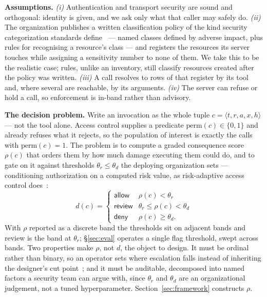 \textbf{Assumptions.} \emph{(i)} Authentication and transport security are
sound and orthogonal: identity is given, and we ask only what that caller may
safely do. \emph{(ii)} The organization publishes a written
classification policy of the kind security categorization standards
define~\cite{nist2004fips199,nist2008sp80060} --- named classes defined by
adverse impact, plus rules for recognising a resource's class --- and registers
the resources its server touches while assigning a sensitivity number to none of
them. We take this to be the realistic case; rules, unlike an inventory, still
classify resources created after the policy was written. \emph{(iii)} A call
resolves to rows of that register by its tool and, where several are reachable,
by its arguments. \emph{(iv)} The server can refuse or hold a call, so
enforcement is in-band rather than advisory.

\textbf{The decision problem.} Write an invocation as the whole tuple
$c = \langle t, r, a, x, h \rangle$ --- not the tool alone. Access control
supplies a predicate $\mathrm{perm}(c) \in \{0,1\}$ and already refuses what it
rejects, so the population of interest is exactly the calls with
$\mathrm{perm}(c) = 1$. The problem is to compute a graded
consequence score $\rho(c)$ that orders them by how much damage executing them
could do, and to gate on it against thresholds $\theta_{r} \le \theta_{d}$ the
deploying organization sets --- conditioning authorization on a computed risk
value, as risk-adaptive access
control does~\cite{cheng2007fuzzymls,kandala2011radac,atlam2020riskbased}:
\begin{equation}
  d(c) =
  \begin{cases}
    \textsf{allow}  & \rho(c) < \theta_{r} \\
    \textsf{review} & \theta_{r} \le \rho(c) < \theta_{d} \\
    \textsf{deny}   & \rho(c) \ge \theta_{d}.
  \end{cases}
  \label{eq:decision}
\end{equation}
With $\rho$ reported as a discrete band the thresholds sit on adjacent bands and
\textsf{review} is the band at $\theta_{r}$; \S\ref{sec:eval} operates a single
flag threshold, swept across bands. Two properties make $\rho$, not
$d$, the object to design. It must be ordinal rather than binary, so an operator
sets where escalation falls instead of inheriting the designer's cut
point~\cite{cao2024mad}; and it must be auditable, decomposed into named factors
a security team can argue with, since $\theta_{r}$ and $\theta_{d}$ are an
organizational judgement, not a tuned hyperparameter.
Section~\ref{sec:framework} constructs $\rho$.
